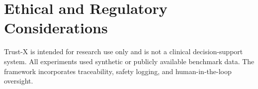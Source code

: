 \documentclass[letterpaper]{article} %
\begin{document}
\section{Ethical and Regulatory Considerations}
Trust-X is intended for research use only and is not a clinical decision-support system.  
All experiments used synthetic or publicly available benchmark data.  
The framework incorporates traceability, safety logging, and human-in-the-loop oversight.

















% 
\end{document}
